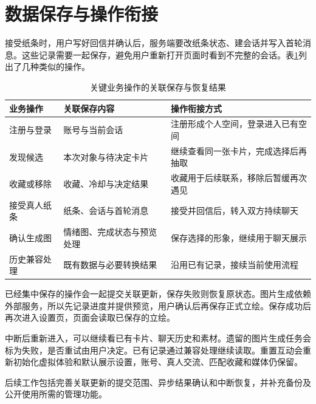 \clearpage
\section{数据保存与操作衔接}
\label{sec:design-consistency}
接受纸条时，用户写好回信并确认后，服务端要改纸条状态、建会话并写入首轮消息。这些记录需要一起保存，避免用户重新打开页面时看到不完整的会话。表\ref{tab:design-transactions}列出了几种类似的操作。

\begin{table}[H]
\centering\small
\caption{关键业务操作的关联保存与恢复结果}\label{tab:design-transactions}
\begin{tabularx}{\linewidth}{@{}p{28mm}p{42mm}X@{}}
\toprule 业务操作 & 关联保存内容 & 操作衔接方式 \\ \midrule
注册与登录 & 账号与当前会话 & 注册形成个人空间，登录进入已有空间 \\
发现候选 & 本次对象与待决定卡片 & 继续查看同一张卡片，完成选择后再抽取 \\
收藏或移除 & 收藏、冷却与决定结果 & 收藏用于后续联系，移除后暂缓再次遇见 \\
接受真人纸条 & 纸条、会话与首轮消息 & 接受并回信后，转入双方持续聊天 \\
确认生成图 & 情绪图、完成状态与预览处理 & 保存选择的形象，继续用于聊天展示 \\
历史兼容处理 & 既有数据与必要转换结果 & 沿用已有记录，接续当前使用流程 \\
\bottomrule
\end{tabularx}
\end{table}

已经集中保存的操作会一起提交关联更新，保存失败则恢复原状态。图片生成依赖外部服务，所以先记录进度并提供预览，用户确认后再保存正式立绘。保存成功后再次进入设置页，页面会读取已保存的立绘。

中断后重新进入，可以继续看已有卡片、聊天历史和素材。遗留的图片生成任务会标为失败，是否重试由用户决定。已有记录通过兼容处理继续读取。重置互动会重新初始化虚拟体验和默认展示设置，账号、真人交流、匹配收藏和媒体仍保留。

后续工作包括完善关联更新的提交范围、异步结果确认和中断恢复，并补充备份及公开使用所需的管理功能。
